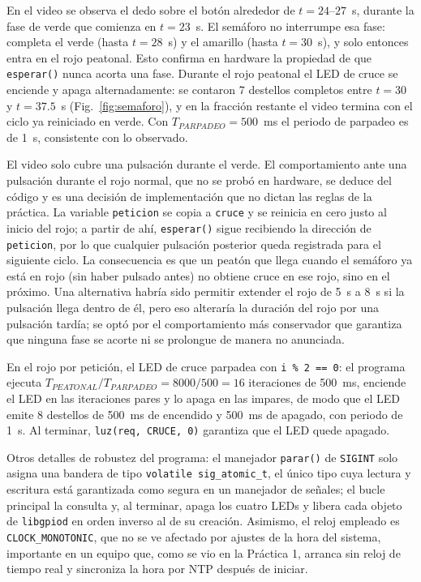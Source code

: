 \documentclass[conference]{IEEEtran}
\begin{document}
En el video se observa el dedo sobre el botón alrededor de $t=24$--$27$~s, durante la fase de verde que comienza en $t=23$~s. El semáforo no interrumpe esa fase: completa el verde (hasta $t=28$~s) y el amarillo (hasta $t=30$~s), y solo entonces entra en el rojo peatonal. Esto confirma en hardware la propiedad de que \texttt{esperar()} nunca acorta una fase. Durante el rojo peatonal el LED de cruce se enciende y apaga alternadamente: se contaron 7 destellos completos entre $t=30$ y $t=37.5$~s (Fig.~\ref{fig:semaforo}), y en la fracción restante el video termina con el ciclo ya reiniciado en verde. Con $T_{PARPADEO}=500$~ms el periodo de parpadeo es de 1~s, consistente con lo observado.

El video solo cubre una pulsación durante el verde. El comportamiento ante una pulsación durante el rojo normal, que no se probó en hardware, se deduce del código y es una decisión de implementación que no dictan las reglas de la práctica. La variable \texttt{peticion} se copia a \texttt{cruce} y se reinicia en cero justo al inicio del rojo; a partir de ahí, \texttt{esperar()} sigue recibiendo la dirección de \texttt{peticion}, por lo que cualquier pulsación posterior queda registrada para el siguiente ciclo. La consecuencia es que un peatón que llega cuando el semáforo ya está en rojo (sin haber pulsado antes) no obtiene cruce en ese rojo, sino en el próximo. Una alternativa habría sido permitir extender el rojo de 5~s a 8~s si la pulsación llega dentro de él, pero eso alteraría la duración del rojo por una pulsación tardía; se optó por el comportamiento más conservador que garantiza que ninguna fase se acorte ni se prolongue de manera no anunciada.

En el rojo por petición, el LED de cruce parpadea con \texttt{i \% 2 == 0}: el programa ejecuta $T_{PEATONAL}/T_{PARPADEO} = 8000/500 = 16$ iteraciones de 500~ms, enciende el LED en las iteraciones pares y lo apaga en las impares, de modo que el LED emite 8 destellos de 500~ms de encendido y 500~ms de apagado, con periodo de 1~s. Al terminar, \texttt{luz(req, CRUCE, 0)} garantiza que el LED quede apagado.

Otros detalles de robustez del programa: el manejador \texttt{parar()} de \texttt{SIGINT} solo asigna una bandera de tipo \texttt{volatile sig\_atomic\_t}, el único tipo cuya lectura y escritura está garantizada como segura en un manejador de señales; el bucle principal la consulta y, al terminar, apaga los cuatro LEDs y libera cada objeto de \texttt{libgpiod} en orden inverso al de su creación. Asimismo, el reloj empleado es \texttt{CLOCK\_MONOTONIC}, que no se ve afectado por ajustes de la hora del sistema, importante en un equipo que, como se vio en la Práctica 1, arranca sin reloj de tiempo real y sincroniza la hora por NTP después de iniciar.
\end{document}
